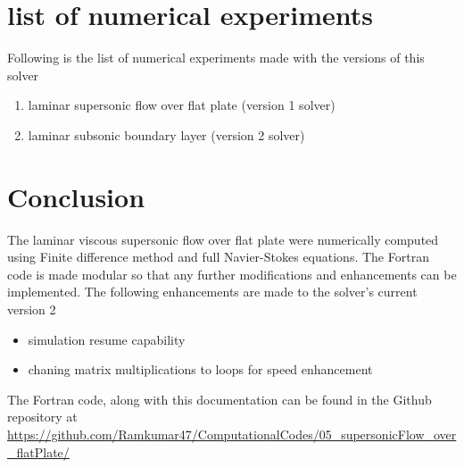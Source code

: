 \documentclass[conf]{new-aiaa}
\begin{document}
\section{list of numerical experiments}
Following is the list of numerical experiments made with the versions of this
solver

\begin{enumerate}
    \item laminar supersonic flow over flat plate (version 1 solver)
    \item laminar subsonic boundary layer (version 2 solver)
\end{enumerate}

\section{Conclusion}
The laminar viscous supersonic flow over flat plate were numerically computed
using Finite difference method and full Navier-Stokes equations. The Fortran
code is made modular so that any further modifications and enhancements can be
implemented. The following enhancements are made to the solver's current
version 2
\begin{itemize}
    \item simulation resume capability
    \item chaning matrix multiplications to loops for speed enhancement
\end{itemize}

\par The Fortran code, along with this documentation can be found in the
Github repository at \url{https://github.com/Ramkumar47/ComputationalCodes/05_supersonicFlow_over_flatPlate/}

% 

%


%
%     
%

\par
\center{**********}
\end{document}

